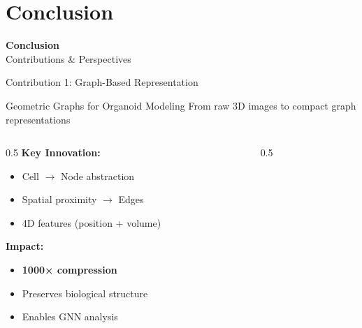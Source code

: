 \documentclass[aspectratio=169]{beamer}
\begin{document}
\section{Conclusion}

\begin{frame}
    \begin{center}
        {\Huge \textbf{Conclusion}}\\[1em]
        {\LARGE Contributions \& Perspectives}
    \end{center}
\end{frame}

\begin{frame}{Contribution 1: Graph-Based Representation}
    \begin{block}{Geometric Graphs for Organoid Modeling}
        From raw 3D images to compact graph representations
    \end{block}
    
    \vspace{0.5em}
    \begin{columns}
        \begin{column}{0.5\textwidth}
            \textbf{Key Innovation:}
            \begin{itemize}
                \item Cell $\rightarrow$ Node abstraction
                \item Spatial proximity $\rightarrow$ Edges
                \item 4D features (position + volume)
            \end{itemize}
            
            \vspace{0.5em}
            \textbf{Impact:}
            \begin{itemize}
                \item \textbf{1000× compression}
                \item Preserves biological structure
                \item Enables GNN analysis
            \end{itemize}
        \end{column}
        \begin{column}{0.5\textwidth}
            \begin{center}
            \end{center}
        \end{column}
    \end{columns}
\end{frame}
\end{document}
